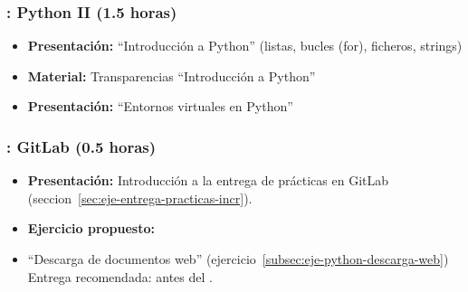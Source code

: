 \documentclass[a4paper,12pt]{article}
\begin{document}

\subsubsection{\juevesC: Python II (1.5 horas)}
\label{cal:juevesC}

\begin{itemize}
\item \textbf{Presentación:} ``Introducción a Python'' (listas, bucles (for), ficheros, strings)
\item \textbf{Material:} Transparencias ``Introducción a Python''
\item \textbf{Presentación:} ``Entornos virtuales en Python''

\end{itemize}

\subsubsection{\juevesC: GitLab (0.5 horas)}
\label{cal:juevesCb}

\begin{itemize}
\item \textbf{Presentación:} Introducción a la entrega de prácticas en GitLab (seccion~\ref{sec:eje-entrega-practicas-incr}).

\item \textbf{Ejercicio propuesto:} \item ``Descarga de documentos web'' (ejercicio~\ref{subsec:eje-python-descarga-web})   Entrega recomendada: antes del \juevesD.

\end{itemize}
\end{document}
